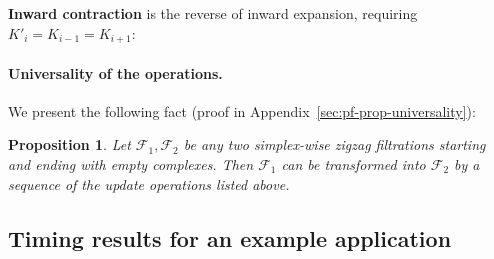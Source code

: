 \documentclass[letterpaper,11pt]{article}
\theoremstyle{mythmstyle}
\newtheorem{proposition}[theorem]{Proposition}
\theoremstyle{mydefstyle}
\theoremstyle{plain}
\newtheorem{proposition}[theorem]{Proposition}
\theoremstyle{definition}
\newcommand{\<}[1]{\langle #1\rangle}
\newcommand{\lbarrowspace}{\;}
\newcommand{\inctosp}[1]{\xhookrightarrow{\lbarrowspace#1\lbarrowspace}}
\newcommand{\bakinctosp}[1]{\xhookleftarrow{\lbarrowspace#1\lbarrowspace}}
\newcommand{\Fcal}{\mathcal{F}}
\newcommand{\sG}{\sigma}
\newcommand{\filtcnt}{m}
\begin{document}
\vspace{-0.5em}
\begin{center}
\end{center}



\noindent
\textbf{{Inward contraction}}
is the reverse of inward expansion, requiring $K'_{i}=K_{i-1}=K_{i+1}$:

\vspace{-1em}
\begin{center}
\end{center}


\paragraph{Universality of the operations.}
We present the following fact (proof in Appendix~\ref{sec:pf-prop-universality}):

\begin{proposition}\label{prop:universality}
Let $\Fcal_1,\Fcal_2$ be any two simplex-wise zigzag filtrations
starting and ending with empty complexes.
Then $\Fcal_1$ can be transformed into $\Fcal_2$ by
a sequence of the update operations listed above.
\end{proposition}

\subsection{Timing results for an example application}
\label{sec:dpc-timing}
\end{document}
